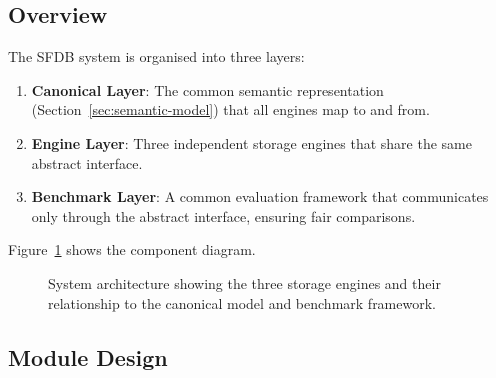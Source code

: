 
\subsection{Overview}

The SFDB system is organised into three layers:

\begin{enumerate}
    \item \textbf{Canonical Layer}: The common semantic representation
        (Section~\ref{sec:semantic-model}) that all engines map to and
        from.
    \item \textbf{Engine Layer}: Three independent storage engines that
        share the same abstract interface.
    \item \textbf{Benchmark Layer}: A common evaluation framework that
        communicates only through the abstract interface, ensuring fair
        comparisons.
\end{enumerate}

Figure~\ref{fig:architecture} shows the component diagram.

\begin{figure}[ht]
\centering
{}
\caption{System architecture showing the three storage engines and
         their relationship to the canonical model and benchmark
         framework.}
\label{fig:architecture}
\end{figure}

\subsection{Module Design}

